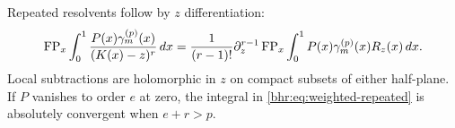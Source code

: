 Repeated resolvents follow by $z$ differentiation:
\begin{equation}\label{bhr:eq:weighted-repeated}
 \operatorname{FP}_x\int_0^1\frac{P(x)\gamma_m^{(p)}(x)}{(K(x)-z)^r}\,dx
  =\frac1{(r-1)!}\partial_z^{r-1}
        \operatorname{FP}_x\int_0^1P(x)\gamma_m^{(p)}(x)R_z(x)\,dx.
\end{equation}
Local subtractions are holomorphic in $z$ on compact subsets of
either half-plane. If $P$ vanishes to order $e$ at zero, the
integral in \eqref{bhr:eq:weighted-repeated} is absolutely convergent
when $e+r>p$.
